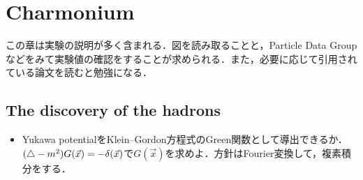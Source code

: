 \section{Charmonium}
この章は実験の説明が多く含まれる．図を読み取ることと，Particle Data Groupなどをみて実験値の確認をすることが求められる．また，必要に応じて引用されている論文を読むと勉強になる．
\subsection{The discovery of the hadrons}
\begin{itemize}
		\item Yukawa potentialをKlein--Gordon方程式のGreen関数として導出できるか．$(\bigtriangleup-m^2)G(\vec{x}) = -\delta(\vec{x}) $で$G(\vec{x}) $を求めよ．方針はFourier変換して，複素積分をする．
				
\end{itemize}


